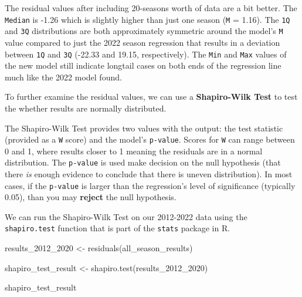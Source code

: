 \documentclass[
  letterpaper,
]{krantz}
\newenvironment{Shaded}{\begin{snugshade}}{\end{snugshade}}
\newcommand{\FunctionTok}[1]{\textcolor[rgb]{0.28,0.35,0.67}{#1}}
\newcommand{\NormalTok}[1]{\textcolor[rgb]{0.00,0.23,0.31}{#1}}
\newcommand{\OtherTok}[1]{\textcolor[rgb]{0.00,0.23,0.31}{#1}}
\begin{document}
The residual values after including 20-seasons worth of data are a bit
better. The \texttt{Median} is -1.26 which is slightly higher than just
one season (\texttt{M} = 1.16). The \texttt{1Q} and \texttt{3Q}
distributions are both approximately symmetric around the model's
\texttt{M} value compared to just the 2022 season regression that
results in a deviation between \texttt{1Q} and \texttt{3Q} (-22.33 and
19.15, respectively). The \texttt{Min} and \texttt{Max} values of the
new model still indicate longtail cases on both ends of the regression
line much like the 2022 model found.

\begin{tcolorbox}[enhanced jigsaw, colback=white, leftrule=.75mm, breakable, colframe=quarto-callout-tip-color-frame, bottomtitle=1mm, rightrule=.15mm, left=2mm, opacityback=0, bottomrule=.15mm, arc=.35mm, coltitle=black, colbacktitle=quarto-callout-tip-color!10!white, toptitle=1mm, titlerule=0mm, title=\textcolor{quarto-callout-tip-color}{\faLightbulb}\hspace{0.5em}{Tip}, toprule=.15mm, opacitybacktitle=0.6]

To further examine the residual values, we can use a
\textbf{Shapiro-Wilk Test} to test the whether results are normally
distributed.

The Shapiro-Wilk Test provides two values with the output: the test
statistic (provided as a \texttt{W} score) and the model's
\texttt{p-value}. Scores for \texttt{W} can range between 0 and 1, where
results closer to 1 meaning the residuals are in a normal distribution.
The \texttt{p-value} is used make decision on the null hypothesis (that
there \emph{is} enough evidence to conclude that there is uneven
distribution). In most cases, if the \texttt{p-value} is larger than the
regression's level of significance (typically 0.05), than you may
\textbf{reject} the null hypothesis.

We can run the Shapiro-Wilk Test on our 2012-2022 data using the
\texttt{shapiro.test} function that is part of the \texttt{stats}
package in R.

\begin{Shaded}
\begin{Highlighting}[]
\NormalTok{results\_2012\_2020 }\OtherTok{\textless{}{-}} \FunctionTok{residuals}\NormalTok{(all\_season\_results)}

\NormalTok{shapiro\_test\_result }\OtherTok{\textless{}{-}} \FunctionTok{shapiro.test}\NormalTok{(results\_2012\_2020)}

\NormalTok{shapiro\_test\_result}
\end{Highlighting}
\end{Shaded}


\end{tcolorbox}
\end{document}
